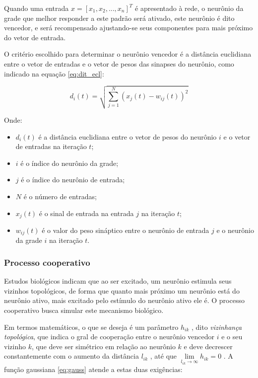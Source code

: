 Quando uma entrada $ x = \left[x_1, x_2, ..., x_n\right]^T $ é apresentado à
rede, o neurônio da grade que melhor responder a este padrão será ativado, este
neurônio é dito vencedor, e será recompensado ajustando-se seus componentes
para mais próximo do vetor de entrada.

O critério escolhido para determinar o neurônio vencedor é a distância
euclidiana entre o vetor de entradas e o vetor de pesos das sinapses do
neurônio, como indicado na equação \ref{eq:dit_ecl}:

\begin{equation}\label{eq:dit_ecl}
d_i(t) = \sqrt{\sum_{j = 1}^N \left( x_j(t) - w_{ij}(t) \right)^2}
\end{equation}

Onde:

\begin{itemize}
\item $ d_i(t) $ é a distância euclidiana entre o vetor de pesos do
neurônio $ i $ e o vetor de entradas na iteração $ t $;
\item $ i $ é o índice do neurônio da grade;
\item $ j $ é o índice do neurônio de entrada;
\item $ N $ é o número de entradas;
\item $ x_j(t) $ é o sinal de entrada na entrada $ j $ na iteração $ t $;
\item $ w_{ij}(t) $ é o valor do peso sináptico entre o neurônio de
entrada $ j $ e o neurônio da grade $ i $ na iteração $ t $.
\end{itemize}

\subsubsection{Processo cooperativo}

Estudos biológicos indicam que ao ser excitado, um neurônio estimula seus
vizinhos topológicos, de forma que quanto mais próximo um neurônio está do
neurônio ativo, mais excitado pelo estímulo do neurônio ativo ele é. O processo
cooperativo busca simular este mecanismo biológico.

Em termos matemáticos, o que se deseja é um parâmetro $ h_{ik} $ , dito
\textit{vizinhança topológica}, que indica o gral de cooperação entre o
neurônio vencedor $ i $ e o seu vizinho $ k $, que deve ser simétrico em relação
ao neurônio $ k $ e deve decrescer constantemente com o aumento da
distância $ l_{ik} $ , até que $ \lim\limits_{ l_{ik} \to \infty } h_{ik} = 0 $ .
A função gaussiana \ref{eq:gauss} atende a estas duas exigências:

